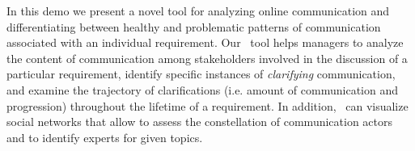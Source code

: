 
In this demo we present a novel tool for analyzing online communication and differentiating between healthy and problematic patterns of communication associated with an individual requirement. 
Our \viss\ tool helps managers to analyze the content of communication among stakeholders involved in the discussion of a particular requirement, identify specific instances of \emph{clarifying} communication, and examine the trajectory of clarifications (i.e. amount of communication and progression) throughout the lifetime of a requirement. 
In addition, \viss\ can visualize social networks that allow to assess the constellation of communication actors and to identify experts for given topics.



